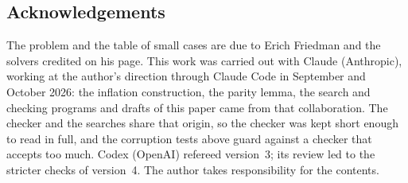 \documentclass[11pt]{amsart}
\theoremstyle{definition}
\begin{document}
\subsection*{Acknowledgements}
The problem and the table of small cases are due to Erich Friedman and the solvers credited on his
page. This work was carried out with Claude (Anthropic), working at the author's direction through
Claude Code in September and October 2026: the inflation construction, the parity lemma, the search
and checking programs and drafts of this paper came from that collaboration.
The checker and the searches share that origin, so the checker was kept short enough to read in full,
and the corruption tests above guard against a checker that accepts too much. Codex (OpenAI) refereed
version~3; its review led to the stricter checks of version~4. The author takes responsibility for the
contents.
\end{document}

